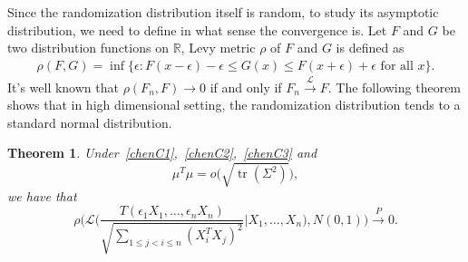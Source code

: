 \documentclass[review]{elsarticle}
\DeclareMathOperator{\mytr}{tr}
\theoremstyle{plain}
\newtheorem{theorem}{\quad\quad Theorem}
\theoremstyle{definition}
\theoremstyle{remark}
\begin{document}
Since the randomization distribution itself is random, to study its asymptotic distribution, we need to define in what sense the convergence is. Let $F$ and $G$ be two distribution functions on $\mathbb{R}$, Levy metric $\rho$ of $F$ and $G$ is defined as
    \begin{equation*}
    \begin{aligned}
        \rho(F,G)
        =\inf\{\epsilon:F(x-\epsilon)-\epsilon\leq G(x)\leq F(x+\epsilon)+\epsilon  \textrm{ for all } x\}.
    \end{aligned}
    \end{equation*}
It's well known that $\rho(F_n,F)\to 0$ if and only if  $F_n\xrightarrow{\mathcal{L}}F$.
The following theorem shows that in high dimensional setting, the randomization distribution tends to a standard normal distribution.


\begin{theorem}\label{shaziCLT}
    Under~\eqref{chenC1},~\eqref{chenC2},~\eqref{chenC3} and 
    \begin{equation}\label{mu2}
        \mu^T\mu=o\big(\sqrt{\mytr ({\Sigma}^2)}\big),
    \end{equation}
    we have that
    \begin{equation*}
            \rho\bigg(\mathcal{L}\bigg(\frac{T(\epsilon_1 X_1,\ldots,\epsilon_n X_n)}{\sqrt{\sum_{1\leq j<i\leq n}{(X_i^T X_j)}^2}}\bigg|X_1,\ldots,X_n\bigg),N(0,1)\bigg)
            \xrightarrow{P} 0.
    \end{equation*}
\end{theorem}
\end{document}
